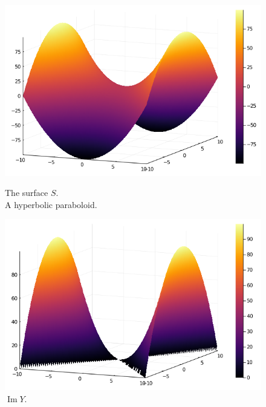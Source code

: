 \documentclass[
    12pt, %
]{fphw}
\DeclareMathOperator{\Ima}{Im}
\begin{document}
\begin{figure}[h]
    \begin{minipage}{0.5\textwidth}
        \centering
        \includegraphics[width=\textwidth]{images/hyperbolic-paraboloid.png}
        \caption{The surface $S$. \\ A hyperbolic paraboloid.}
    \end{minipage}%
%
    \begin{minipage}{0.5\textwidth}
        \centering
        \includegraphics[width=\textwidth]{images/image-parametrization-Y.png}
        \caption{$\Ima Y$.}
    \end{minipage}
\end{figure}

\end{document}
